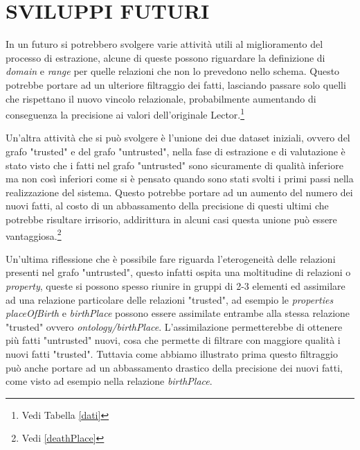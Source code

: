 \documentclass[10pt,a4paper,twocolumn]{article}
\begin{document}
\section{SVILUPPI FUTURI}

In un futuro si potrebbero svolgere varie attività utili al miglioramento del processo di estrazione, alcune di queste possono riguardare la definizione di \textit{domain} e \textit{range} per quelle relazioni che non lo prevedono nello schema. Questo potrebbe portare ad un ulteriore filtraggio dei fatti, lasciando passare solo quelli che rispettano il nuovo vincolo relazionale, probabilmente aumentando di conseguenza la precisione ai valori dell'originale Lector.\footnote{Vedi Tabella \ref{dati}}

Un'altra attività che si può svolgere è l'unione dei due dataset iniziali, ovvero del grafo "trusted" e del grafo "untrusted", nella fase di estrazione e di valutazione è stato visto che i fatti nel grafo "untrusted" sono sicuramente di qualità inferiore ma non così inferiori come si è pensato quando sono stati svolti i primi passi nella realizzazione del sistema. Questo potrebbe portare ad un aumento del numero dei nuovi fatti, al costo di un abbassamento della precisione di questi ultimi che potrebbe risultare irrisorio, addirittura in alcuni casi questa unione può essere vantaggiosa.\footnote{Vedi \ref{deathPlace}}

Un'ultima riflessione che è possibile fare riguarda l'eterogeneità delle relazioni presenti nel grafo "untrusted", questo infatti ospita una moltitudine di relazioni o \textit{property}, queste si possono spesso riunire in gruppi di 2-3 elementi ed assimilare ad una relazione particolare delle relazioni "trusted", ad esempio le \textit{properties} \textit{placeOfBirth} e \textit{birthPlace} possono essere assimilate entrambe alla stessa relazione "trusted" ovvero \textit{ontology/birthPlace}. L'assimilazione permetterebbe di ottenere più fatti "untrusted" nuovi, cosa che permette di filtrare con maggiore qualità i nuovi fatti "trusted". Tuttavia come abbiamo illustrato prima questo filtraggio può anche portare ad un abbassamento drastico della precisione dei nuovi fatti, come visto ad esempio nella relazione \textit{birthPlace}.
\end{document}
